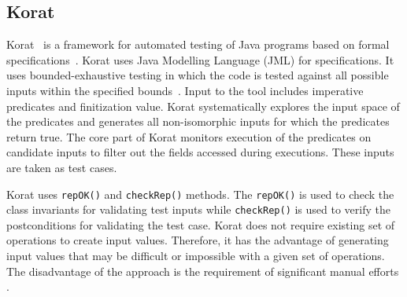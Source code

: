 
\subsection{Korat} %
Korat~\cite{boyapati2002korat} is a framework for automated testing of Java programs based on formal specifications~\cite{chang1999structural}. %
Korat uses Java Modelling Language (JML) for specifications. It uses bounded-exhaustive testing in which the code is tested against all possible inputs within the specified bounds~\cite{khurshid2001checking}. %
Input to the tool includes imperative predicates and finitization value. Korat systematically explores the input space of the predicates and generates all non-isomorphic inputs for which the predicates return true. The core part of Korat monitors execution of the predicates on candidate inputs to filter out the fields accessed during executions. These inputs are taken as test cases. 

Korat uses \verb+repOK()+ and \verb+checkRep()+ methods. The \verb+repOK()+ is used to check the class invariants for validating test inputs while \verb+checkRep()+ is used to verify the postconditions for validating the test case. Korat does not require existing set of operations to create input values. Therefore, it has the advantage of generating input values that may be difficult or impossible with a given set of operations. The disadvantage of the approach is the requirement of significant manual efforts \cite{pacheco2009directed}.    

